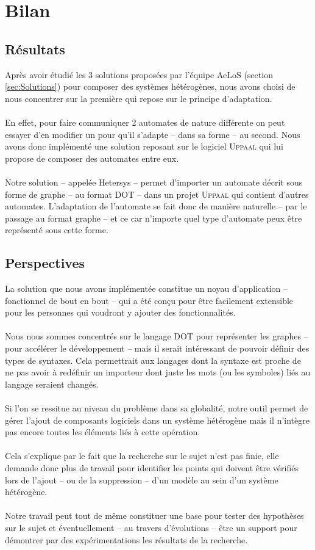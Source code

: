 \documentclass[12pt,a4paper]{report}
\begin{document}
\chapter{Bilan}
\section{Résultats}
Après avoir étudié les 3 solutions proposées par l'équipe AeLoS (section \ref{sec:Solutions}) pour composer des systèmes hétérogènes, 
nous avons choisi de nous concentrer sur la première qui repose sur le principe d'adaptation.
\\\\
En effet, pour faire communiquer 2 automates de nature différente on peut essayer d'en modifier un 
pour qu'il s'adapte -- dans sa forme -- au second. Nous avons donc implémenté une solution reposant sur 
le logiciel \textsc{Uppaal} qui lui propose de composer des automates entre eux.
\\\\
Notre solution -- appelée Hetersys -- permet d'importer un automate décrit sous forme de graphe -- au format DOT --
dans un projet \textsc{Uppaal} qui contient d'autres automates. L'adaptation de l'automate se fait donc de manière naturelle
-- par le passage au format graphe -- et ce car n'importe quel type d'automate peux être représenté sous cette forme.

\section{Perspectives}
La solution que nous avons implémentée constitue un noyau d'application -- fonctionnel de bout en bout -- qui a été conçu 
pour être facilement extensible pour les personnes qui voudront y ajouter des fonctionnalités. 
\\\\
Nous nous sommes concentrés sur
le langage DOT pour représenter les graphes -- pour accélérer le développement -- mais il serait intéressant de pouvoir définir des types de syntaxes.
Cela permettrait aux langages dont la syntaxe est proche de ne pas avoir à redéfinir un importeur dont juste les mots (ou les symboles)
liés au langage seraient changés. 
\\\\
Si l'on se ressitue au niveau du problème dans sa globalité, notre outil permet de gérer l'ajout de composants logiciels
dans un système hétérogène mais il n'intègre pas encore toutes les éléments liés à cette opération. 
\\\\
Cela s'explique par le fait que la recherche sur le sujet n'est pas finie, elle demande donc plus de travail pour identifier
les points qui doivent être vérifiés lors de l'ajout -- ou de la suppression -- d'un modèle au sein d'un système hétérogène.
\\\\
Notre travail peut tout de même constituer une base pour tester des hypothèses sur le sujet et éventuellement  -- au travers
d'évolutions -- être un support pour démontrer par des expérimentations les résultats de la recherche.
\end{document}
